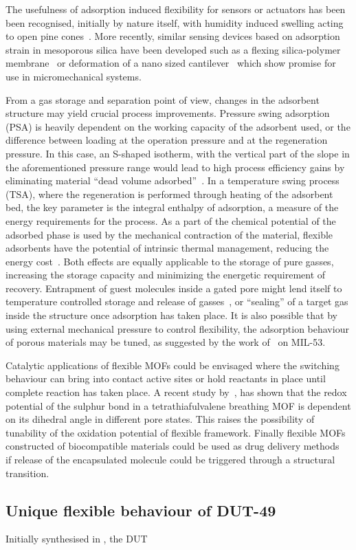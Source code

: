 The usefulness of adsorption induced flexibility for sensors or
actuators has been been recognised, initially by nature itself,
with humidity induced swelling acting to open pine 
cones~\cite{dawsonHowPineCones1997}.
More recently, similar sensing devices based on adsorption strain 
in mesoporous silica have been 
developed such as a flexing silica-polymer 
membrane~\cite{boudotConvertingWaterAdsorption2016} or 
deformation of a nano sized 
cantilever~\cite{ganserCantileverBendingBased2016} 
which show promise for use in micromechanical systems. 

From a gas storage and separation point of view, changes in the
adsorbent structure may yield crucial process improvements. 
Pressure swing adsorption (PSA) is heavily
dependent on the working capacity of the adsorbent used, or the
difference between loading at the operation pressure and at the 
regeneration pressure. In this case, an S-shaped isotherm, with 
the vertical part of the slope in the aforementioned pressure 
range would lead to high process efficiency gains by eliminating material
``dead volume adsorbed''~\cite{schneemannFlexibleMetalOrganic2014}. 
In a temperature swing process (TSA), where 
the regeneration is performed through heating of the adsorbent 
bed, the key parameter is the integral enthalpy of adsorption, a measure 
of the energy requirements for the process. As a part of the chemical 
potential of the adsorbed phase is used by the mechanical contraction
of the material, flexible adsorbents have the potential of
intrinsic thermal management, reducing the energy 
cost~\cite{masonMethaneStorageFlexible2015}.
Both effects are equally applicable to the storage of pure 
gasses, increasing the storage capacity and minimizing the energetic
requirement of recovery. Entrapment of guest molecules inside 
a gated pore might lend itself to temperature controlled storage and 
release of gasses~\cite{bunzenAchievingLargeVolumetric2018}, or
``sealing'' of a target gas inside the structure once adsorption
has taken place.
It is also possible that by using external mechanical pressure to
control flexibility, the adsorption behaviour of porous materials
may be tuned, as suggested by the work 
of~\citet{chanutUsingExternalFactors2016} on MIL-53. 

Catalytic applications of flexible MOFs could be envisaged where 
the switching behaviour can bring into contact active sites or 
hold reactants in place until complete reaction has taken place.
A recent study by~\citet{soutoBreathingDependentRedoxActivity2018},
has shown that the redox potential of the sulphur bond in a 
tetrathiafulvalene breathing MOF is dependent on its dihedral 
angle in different pore states. This raises the possibility of 
tunability of the oxidation potential of flexible framework.
Finally flexible MOFs constructed of biocompatible materials 
could be used as drug delivery 
methods~\cite{mckinlayNitricOxideAdsorption2013, %
horcajadaFlexiblePorousMetalOrganic2008} if release 
of the encapsulated molecule could be triggered through a 
structural transition.


\subsection{Unique flexible behaviour of DUT-49}

Initially synthesised in \citeyear{stoeckHighlyPorousMetal2012},
the DUT 

